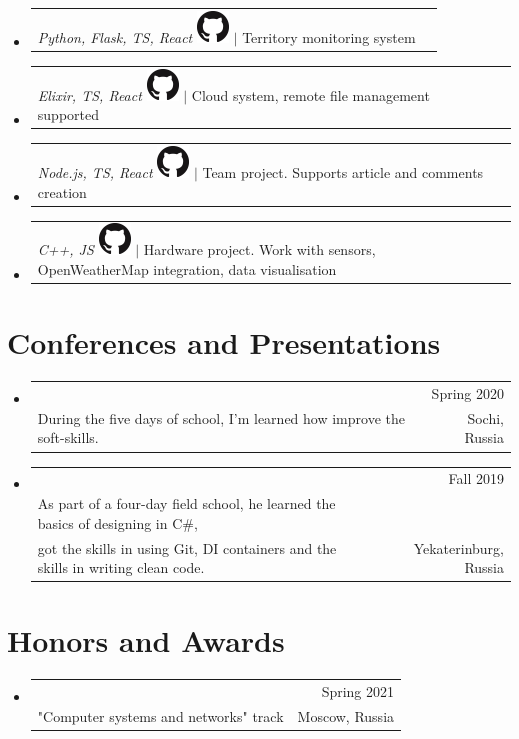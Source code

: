 \documentclass[A4,11pt]{article}
\makeatletter
\newcommand{\CVSubheading}[4]{
  \vspace{-2pt}\item
    \begin{tabular*}{0.97\textwidth}[t]{l@{\extracolsep{\fill}}r}
      \textbf{#1} & #2 \\
      \small#3 & \small #4 \\
    \end{tabular*}\vspace{-7pt}
}
\newcommand{\GithubProjectDescription}[3]{
  \vspace{-2pt}\item
    \begin{tabular*}{0.5\textwidth}[t]{l@{\extracolsep{\fill}}r}
      \textit{#1}
      {\href{#2}{\includegraphics[scale=.3]{images/GitHub-Mark-32px.png}}} 
      $|$ 
      #3
    \end{tabular*}\vspace{-7pt}
}
\newcommand{\lowDescendersUnderline}[1]{%
  \uline{\phantom{#1}}%
  \llap{\contour{white}{#1}}%
}
\newcommand{\link}[2]{
  \href{#1}{\lowDescendersUnderline{#2}}
}
\newcommand{\CVSubHeadingListStart}{\begin{itemize}[leftmargin=0.5cm, label={}]}
\newcommand{\CVSubHeadingListEnd}{\end{itemize}}
\makeatother
\begin{document}
 \CVSubHeadingListStart
    \GithubProjectDescription
        {Python, Flask, TS, React}{https://github.com/Sapfir0/premier-eye}{Territory monitoring system}
    \GithubProjectDescription
        {Elixir, TS, React}{https://github.com/Sapfir0/LiquidCloud}{Cloud system, remote file management supported}
    \GithubProjectDescription
        {Node.js, TS, React}{https://github.com/avdosev/metida}{Team project. Supports article and comments creation}
    \GithubProjectDescription
        {C++, JS}{https://github.com/Sapfir0/Meteo-Server}{Hardware project. Work with sensors, OpenWeatherMap integration, data visualisation}
  \CVSubHeadingListEnd



\section{Conferences and Presentations}
  \CVSubHeadingListStart
    \CVSubheading
      {\link{https://yandex.ru/profi/school/soft_radio}{Winter school URFU "Software engineering and radio engieering"}}{Spring 2020}
      {During the five days of school, I’m learned how improve the soft-skills. }{Sochi, Russia}
    \CVSubheading
      {\link{https://kontur.ru/education/programs/kampus/2020}{Project “Campus” SKB KONTUR} }{Fall 2019}
      {As part of a four-day field school, he learned the basics of designing in C\#, \\
      got the skills in using Git, DI containers and the skills in writing clean code. }{ Yekaterinburg, Russia }
  \CVSubHeadingListEnd

\section{Honors and Awards}
  \CVSubHeadingListStart
    \CVSubheading
      {\link{https://olymp.hse.ru/ma/}{2nd degree diploma of the HSE olympiad "Major League"}}{Spring 2021}
      {"Computer systems and networks" track}{Moscow, Russia}
  \CVSubHeadingListEnd

\end{document}
